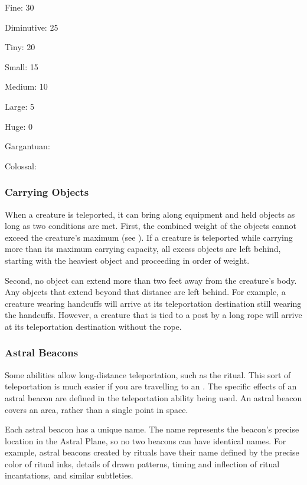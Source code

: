       \begin{raggeditemize}
        \item Fine: 30
        \item Diminutive: 25
        \item Tiny: 20
        \item Small: 15
        \item Medium: 10
        \item Large: 5
        \item Huge: 0
        \item Gargantuan: 
        \item Colossal: 
      \end{raggeditemize}

    \subsubsection{Carrying Objects}
      When a creature is teleported, it can bring along equipment and held objects as long as two conditions are met.
      First, the combined weight of the objects cannot exceed the creature's maximum  (see ).
      If a creature is teleported while carrying more than its maximum carrying capacity, all excess objects are left behind, starting with the heaviest object and proceeding in order of weight.

      Second, no object can extend more than two feet away from the creature's body.
      Any objects that extend beyond that distance are left behind.
      For example, a creature wearing handcuffs will arrive at its teleportation destination still wearing the handcuffs.
      However, a creature that is tied to a post by a long rope will arrive at its teleportation destination without the rope.

    \subsubsection{Astral Beacons}\label{Astral Beacons}
      Some abilities allow long-distance teleportation, such as the  ritual.
      This sort of teleportation is much easier if you are travelling to an .
      The specific effects of an astral beacon are defined in the teleportation ability being used.
      An astral beacon covers an area, rather than a single point in space.

      Each astral beacon has a unique name.
      The name represents the beacon's precise location in the Astral Plane, so no two beacons can have identical names.
      For example, astral beacons created by rituals have their name defined by the precise color of ritual inks, details of drawn patterns, timing and inflection of ritual incantations, and similar subtleties.

